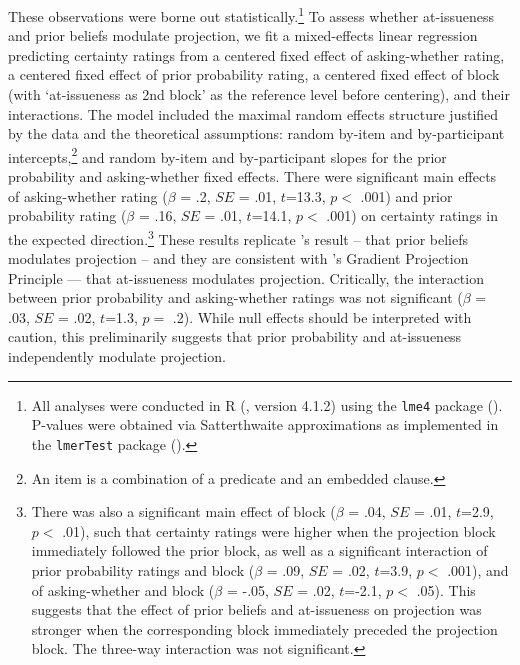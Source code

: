 \documentclass[11pt,fleqn]{article}
\newcommand{\6}{\mbox{$[\hspace*{-.6mm}[$}}
\newcommand{\9}{\mbox{$]\hspace*{-.6mm}]$}}
\newcommand{\citepos}[1]{\citeauthor{#1}'s \citeyear{#1}}
\begin{document}

These observations were borne out statistically.\footnote{All analyses were conducted in R (\citealt{R}, version 4.1.2) using the {\tt lme4} package (\citealt{bates-etal2015}). P-values were obtained via Satterthwaite approximations as implemented in the {\tt lmerTest} package (\citealt{kuznetsova-etal2017}).}  To assess whether at-issueness  and prior beliefs  modulate projection, we fit a mixed-effects linear regression predicting certainty ratings from a centered fixed effect of asking-whether rating, a centered fixed effect of prior probability rating, a centered fixed effect of block (with `at-issueness as 2nd block' as the reference level before centering), and their interactions. The model included the maximal random effects structure justified by the data and the theoretical assumptions: random by-item and by-participant intercepts,\footnote{An item is a combination of a predicate and an embedded clause.} and random by-item and by-participant slopes for the prior probability and asking-whether fixed effects. There were significant main effects of  asking-whether rating ($\beta$ = .2,  $SE$ = .01, $t$=13.3, $p<$ .001) and prior probability rating ($\beta$ = .16,  $SE$ = .01, $t$=14.1, $p<$ .001)  on certainty ratings in the expected direction.\footnote{There was also a significant main effect of block ($\beta$ = .04,  $SE$ = .01, $t$=2.9, $p<$ .01), such that certainty ratings were higher when the projection block immediately followed the prior block, as well as a significant interaction of prior probability ratings and block ($\beta$ = .09,  $SE$ = .02, $t$=3.9, $p<$ .001), and  of asking-whether and block ($\beta$ = -.05,  $SE$ = .02, $t$=-2.1, $p<$ .05). This suggests that the effect of prior beliefs and at-issueness on projection was stronger when the corresponding block immediately preceded the projection block. The three-way interaction was not significant.} These results replicate \citepos{degen-tonhauser-openmind} result -- that prior beliefs modulates projection -- and they are consistent with \citepos{tbd-variability} Gradient Projection Principle --- that at-issueness modulates projection. Critically, the interaction between prior probability and asking-whether ratings was not significant ($\beta$ = .03,  $SE$ = .02, $t$=1.3, $p=$ .2). While null effects should be interpreted with caution, this preliminarily suggests that prior probability and at-issueness independently modulate projection. 
\end{document}
